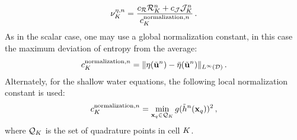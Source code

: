 \begin{equation}
   \entropycellviscosity[n] = \frac{\entropyresidualcoef
   \entropyresidual_\cellindex^\timeindex
   + \entropyjumpcoef\entropyjump_\cell^\timeindex}
   {c^{\text{normalization},\timeindex}_\cell}
   \eqp
\end{equation}
As in the scalar case, one may use a global normalization constant, in this case
the maximum deviation of entropy from the average:
\begin{equation}
  c^{\text{normalization},n}_K = \|\eta(\tilde{\mathbf{u}}^n)
   -\bar{\eta}(\tilde{\mathbf{u}}^n)\|_{L^\infty(\mathcal{D})}
  \,.
\end{equation}
Alternately, for the shallow water equations, the following local normalization
constant is used:
\begin{equation}
  c^{\text{normalization},n}_K
  = \min\limits_{\mathbf{x}_q\in\mathcal{Q}_K} g (\tilde{h}^n(\mathbf{x}_q))^2
  \,,
\end{equation}
where $\mathcal{Q}_K$ is the set of quadrature points in cell $K$.

